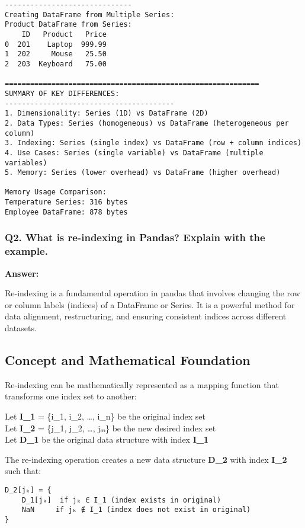 \documentclass[11pt]{article}
\begin{document}
\begin{Verbatim}[commandchars=\\\{\}]
------------------------------
Creating DataFrame from Multiple Series:
Product DataFrame from Series:
    ID   Product   Price
0  201    Laptop  999.99
1  202     Mouse   25.50
2  203  Keyboard   75.00

============================================================
SUMMARY OF KEY DIFFERENCES:
----------------------------------------
1. Dimensionality: Series (1D) vs DataFrame (2D)
2. Data Types: Series (homogeneous) vs DataFrame (heterogeneous per column)
3. Indexing: Series (single index) vs DataFrame (row + column indices)
4. Use Cases: Series (single variable) vs DataFrame (multiple variables)
5. Memory: Series (lower overhead) vs DataFrame (higher overhead)

Memory Usage Comparison:
Temperature Series: 316 bytes
Employee DataFrame: 878 bytes
    \end{Verbatim}

    \subsubsection{Q2. What is re-indexing in Pandas? Explain with the
example.}\label{q2.-what-is-re-indexing-in-pandas-explain-with-the-example.}

\textbf{Answer:}

Re-indexing is a fundamental operation in pandas that involves changing
the row or column labels (indices) of a DataFrame or Series. It is a
powerful method for data alignment, restructuring, and ensuring
consistent indices across different datasets.

\subsection{Concept and Mathematical
Foundation}\label{concept-and-mathematical-foundation}

Re-indexing can be mathematically represented as a mapping function that
transforms one index set to another:

Let \textbf{I\_1} = \{i\_1, i\_2, \ldots, i\_n\} be the original index
set\\
Let \textbf{I\_2} = \{j\_1, j\_2, \ldots, jₘ\} be the new desired index
set\\
Let \textbf{D\_1} be the original data structure with index
\textbf{I\_1}

The re-indexing operation creates a new data structure \textbf{D\_2}
with index \textbf{I\_2} such that:

\begin{verbatim}
D_2[jₖ] = {
    D_1[jₖ]  if jₖ ∈ I_1 (index exists in original)
    NaN     if jₖ ∉ I_1 (index does not exist in original)
}
\end{verbatim}
\end{document}
